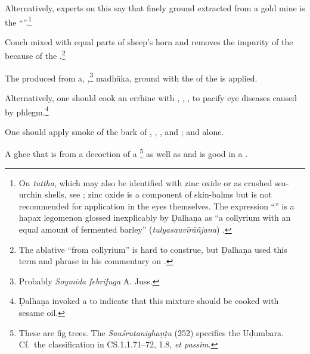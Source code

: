 \begin{translation}
    Alternatively, experts on this say that finely ground  extracted from a gold mine is the “”.\footnote{On \emph{tuttha}, which may 
    also be identified with zinc
oxide or as crushed sea-urchin shells, see \citet[112\,ff.]{falk-1991}; zinc
oxide is a component of skin-balms but is not recommended for application in
the eyes themselves.  The expression “” is a
hapax legomenon glossed inexplicably by Ḍalhaṇa as “a collyrium with an equal
amount of fermented barley” (\emph{tulyasauvīrāñjana}) \citep[628]{vulgate}.}
    
    \item [37]
    
    Conch mixed with equal parts of sheep's horn and  removes the
    impurity of the  because of the .\footnote{The ablative “from 
        collyrium” is hard to construe, but 
    Ḍalhaṇa used this term and phrase in his commentary on .}
    
    
    
    The  produced from 
    a,
    ,\footnote{Probably \emph{Soymida febrifuga} A. Juss.}
    \gls{madhūka},
    ground with the  of the  is 
    applied. 
    
    \item[38]
    
    Alternatively, one should cook an errhine with 
    ,
    ,
    ,
     to pacify eye diseases caused by 
    phlegm.\footnote{Ḍalhaṇa invoked a  to indicate that 
    this mixture should be cooked with sesame oil. }
    
    
    
    One should apply smoke of the bark of
    ,
    ,
    ,
    and
    ; and
     alone.
    
    \item[39] 
    
    A ghee that is  from a decoction of a
    \footnote{These are fig trees.  The 
    \emph{Sauśrutanighaṇṭu} (252) specifies the Uḍumbara. Cf.\ the classification in
    CS.1.1.71--72, 1.8, \emph{et passim}.}
    as well as 
    and 
    is good in a 
    . 
    

\end{translation}
